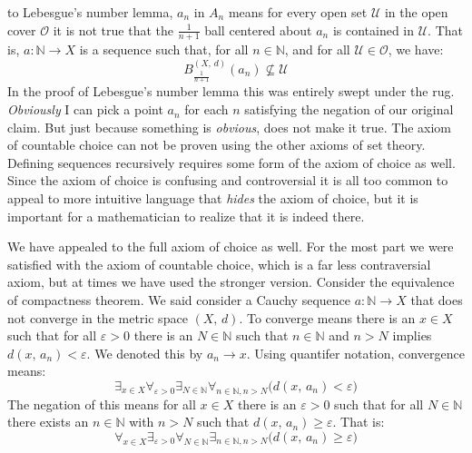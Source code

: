 \documentclass{article}
\theoremstyle{normal}
\begin{document}
    to Lebesgue's number lemma, $a_{n}$ in $A_{n}$ means for every open set
    $\mathcal{U}$ in the open cover $\mathcal{O}$ it is not true that
    the $\frac{1}{n+1}$ ball centered about $a_{n}$ is contained in
    $\mathcal{U}$. That is, $a:\mathbb{N}\rightarrow{X}$ is a sequence such
    that, for all $n\in\mathbb{N}$, and for all $\mathcal{U}\in\mathcal{O}$, we
    have:
    \begin{equation}
        B_{\frac{1}{n+1}}^{(X,\,d)}(a_{n})\nsubseteq\mathcal{U}
    \end{equation}
    In the proof of Lebesgue's number lemma this was entirely swept under the
    rug. \textit{Obviously} I can pick a point $a_{n}$ for each $n$ satisfying
    the negation of our original claim. But just because something is
    \textit{obvious}, does not make it true. The axiom of countable choice can
    not be proven using the other axioms of set theory. Defining sequences
    recursively requires some form of the axiom of choice as well. Since the
    axiom of choice is confusing and controversial it is all too common to
    appeal to more intuitive language that \textit{hides} the axiom of choice,
    but it is important for a mathematician to realize that it is indeed there.
    \par\hfill\par
    We have appealed to the full axiom of choice as well. For the most part we
    were satisfied with the axiom of countable choice, which is a far less
    contraversial axiom, but at times we have used the stronger version.
    Consider the equivalence of compactness theorem. We said consider a Cauchy
    sequence $a:\mathbb{N}\rightarrow{X}$ that does not converge in the metric
    space $(X,\,d)$. To converge means there is an $x\in{X}$ such that for all
    $\varepsilon>0$ there is an $N\in\mathbb{N}$ such that $n\in\mathbb{N}$ and
    $n>N$ implies $d(x,\,a_{n})<\varepsilon$. We denoted this by
    $a_{n}\rightarrow{x}$. Using quantifer notation, convergence means:
    \begin{equation}
        \exists_{x\in{X}}\forall_{\varepsilon>0}
            \exists_{N\in\mathbb{N}}\forall_{n\in\mathbb{N},n>N}
            \big(d(x,\,a_{n})<\varepsilon\big)
    \end{equation}
    The negation of this means for all $x\in{X}$ there is an
    $\varepsilon>0$ such that for all $N\in\mathbb{N}$ there exists an
    $n\in\mathbb{N}$ with $n>N$ such that
    $d(x,\,a_{n})\geq\varepsilon$. That is:
    \begin{equation}
        \forall_{x\in{X}}\exists_{\varepsilon>0}\forall_{N\in\mathbb{N}}
            \exists_{n\in\mathbb{N},n>N}\big(d(x,\,a_{n})\geq\varepsilon\big)
    \end{equation}
\end{document}
